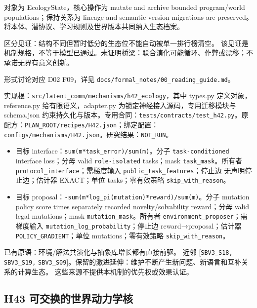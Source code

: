 \documentclass[
  10pt,
]{article}
\begin{document}
对象为 EcologyState，核心操作为 mutate and archive bounded program/world
populations；保持关系为 lineage and semantic version migrations are
preserved。将本体、潜协议、学习规则及世界版本共同纳入生态档案。

区分见证：结构不同但暂时低分的生态位不能自动被单一排行榜清空。
该见证是机制规格，不等于模型已通过。未证明桥梁：联合演化可能循环、作弊或漂移；不承诺无界有意义创新。

形式讨论对应 D02 F09，详见
{\small\nolinkurl{docs/formal_notes/00_reading_guide.md}}。

实现根：{\small\nolinkurl{src/latent_comm/mechanisms/h42_ecology}}，其中
types.py 定义对象，reference.py 给有限语义，adapter.py
为锁定神经接入源码，专用迁移模块与 schema.json
约束持久化与版本。专用合同：{\small\nolinkurl{tests/contracts/test_h42.py}}。原配方：{\small\nolinkurl{PLAN_ROOT/recipes/H42.json}}；绑定配置：{\small\nolinkurl{configs/mechanisms/H42.json}}。研究结果：\nolinkurl{NOT_RUN}。

\begin{itemize}
\item
  目标 interface：{\small\nolinkurl{sum(m*task_error)/sum(m)}}。分子
  \nolinkurl{task-conditioned} interface loss；分母 valid
  \nolinkurl{role-isolated} tasks；mask \nolinkurl{task_mask}。所有者
  \nolinkurl{protocol_interface}；需梯度输入
  \nolinkurl{public_task_features}；停止边 无声明停止边；估计器
  EXACT；单位 tasks；零有效策略 \nolinkurl{skip_with_reason}。
\item
  目标
  proposal：{\small\nolinkurl{-sum(m*log_pi(mutation)*reward)/sum(m)}}。分子
  mutation policy score times separately recorded novelty/solvability
  reward；分母 valid legal mutations；mask
  \nolinkurl{mutation_mask}。所有者
  \nolinkurl{environment_proposer}；需梯度输入
  \nolinkurl{mutation_log_probability}；停止边 reward→proposal；估计器
  \nolinkurl{POLICY_GRADIENT}；单位 mutations；零有效策略
  \nolinkurl{skip_with_reason}。
\end{itemize}

已有原语：环境/解法共演化与抽象库增长都有直接前驱。 近邻
{[}\nolinkurl{SBV3_S18,} \nolinkurl{SBV3_S19,}
\nolinkurl{SBV3_S09}{]}。保留的激进延伸：维护不断产生新问题、新语言和互补关系的计算生态。
这些来源不提供本机制的优先权或效果认证。

\subsection{H43
可交换的世界动力学核}\label{h43-ux53efux4ea4ux6362ux7684ux4e16ux754cux52a8ux529bux5b66ux6838}
\end{document}
